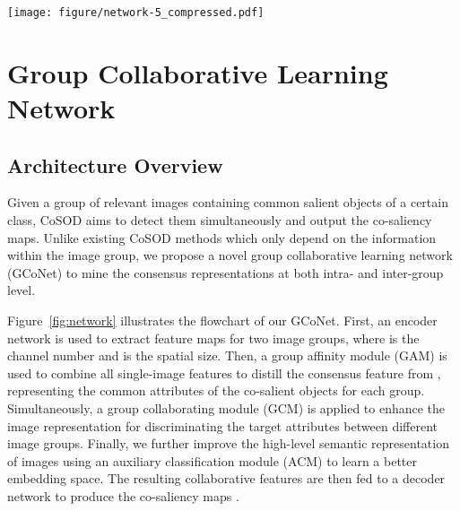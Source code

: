 \documentclass[final]{cvpr}
\def\ourmodel{GCoNet}
\begin{document}
\begin{figure*}[!t]
\centering
\texttt{[image: figure/network-5\_compressed.pdf]}
\caption{\textbf{Pipeline of the proposed Group Collaborative Learning Network (\ourmodel).} Images in two groups are first processed by a weight-shared encoder. Then we employ the group affinity module (GAM, see Figure~\ref{fig:gam} for more details) to conduct intra-group collaborative learning for each group to generate a consensus, which is collaborated with the original feature maps to segment co-salient objects using the decoder. In addition, the original feature maps and consensuses of both groups are fed to the group collaborating module (GCM, see Figure~\ref{fig:gcm}) to conduct the inter-group collaborative learning. Moreover an auxiliary classification module (ACM) is applied to obtain the high-level semantic representation. The GCM and ACM are only used for training and are removed at inference.}
\label{fig:network}
\end{figure*}



\section{Group Collaborative Learning Network}

\subsection{Architecture Overview}




Given a group of  relevant images 
containing common salient objects of a certain class, CoSOD aims to detect them simultaneously and output the co-saliency maps. Unlike  existing CoSOD methods which only depend on the information within the image group, we propose a novel group collaborative learning network (\ourmodel) to mine the consensus representations at both  intra- and inter-group level. 

Figure~\ref{fig:network} illustrates the flowchart of our \ourmodel. First, an encoder network is used to extract feature maps  for two image groups, where  is the channel number and  is the spatial size. 
Then, a group affinity module (GAM) is used to combine all single-image features  to distill the consensus feature  from , representing the common attributes of the co-salient objects for each group.  Simultaneously, a group collaborating module (GCM) is applied to enhance the  image representation for discriminating the target attributes between  different image groups. Finally, we further improve the high-level semantic representation of images using an auxiliary classification module (ACM) to learn a better embedding space. The resulting collaborative features are then fed to a decoder network to produce the co-saliency maps .
\end{document}
